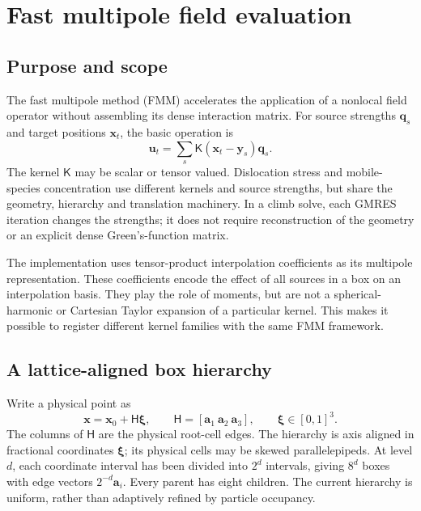 \chapter{Fast multipole field evaluation}\label{chap:fmm}

\section{Purpose and scope}
The fast multipole method (FMM) accelerates the application of a nonlocal field
operator without assembling its dense interaction matrix. For source strengths
$\bm q_s$ and target positions $\bm x_t$, the basic operation is
\begin{equation}
 \bm u_t=\sum_s \mathsf K(\bm x_t-\bm y_s)\bm q_s.
 \label{eq:fmmDiscreteOperator}
\end{equation}
The kernel $\mathsf K$ may be scalar or tensor valued. Dislocation stress and
mobile-species concentration use different kernels and source strengths, but
share the geometry, hierarchy and translation machinery. In a climb solve,
each GMRES iteration changes the strengths; it does not require reconstruction
of the geometry or an explicit dense Green's-function matrix.

The implementation uses tensor-product interpolation coefficients as its
multipole representation. These coefficients encode the effect of all sources
in a box on an interpolation basis. They play the role of moments, but are not
a spherical-harmonic or Cartesian Taylor expansion of a particular kernel.
This makes it possible to register different kernel families with the same
FMM framework.

\section{A lattice-aligned box hierarchy}
Write a physical point as
\begin{equation}
 \bm x=\bm x_0+\mathsf H\bm\xi,\qquad
 \mathsf H=[\bm a_1\ \bm a_2\ \bm a_3],\qquad
 \bm\xi\in[0,1]^3.
 \label{eq:fmmAffineCell}
\end{equation}
The columns of $\mathsf H$ are the physical root-cell edges. The hierarchy is
axis aligned in fractional coordinates $\bm\xi$; its physical cells may be
skewed parallelepipeds. At level $d$, each coordinate interval has been divided
into $2^d$ intervals, giving $8^d$ boxes with edge vectors
$2^{-d}\bm a_i$. Every parent has eight children. The current hierarchy is
uniform, rather than adaptively refined by particle occupancy.

